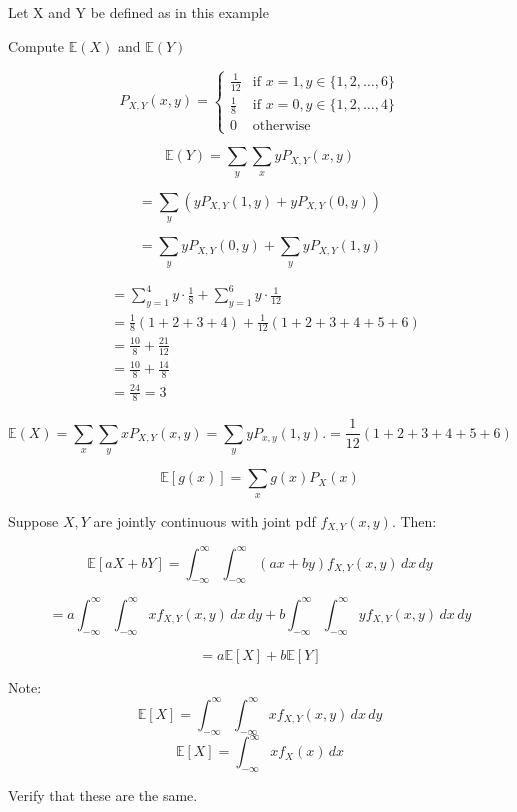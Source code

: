 \documentclass{article}
\begin{document}
    Let X and Y be defined as in this example

    Compute $\mathbb{E}(X)$ and $\mathbb{E}(Y)$

    \[P_{X,Y}(x,y) = 
    \begin{cases}
        \frac{1}{12} & \text{if } x = 1, y \in \{1,2,\ldots,6\} \\
        \frac{1}{8} & \text{if } x = 0, y \in \{1,2,\ldots,4\} \\
        0 & \text{otherwise}
    \end{cases}\]

    \[\mathbb{E}(Y) = \sum_{y} \sum_{x} y P_{X,Y}(x,y)\]
    
    \[= \sum_{y} \left(yP_{X,Y}(1,y) + yP_{X,Y}(0,y)\right)\]
    
    \[= \sum_{y} y P_{X,Y}(0,y) + \sum_{y} y P_{X,Y}(1,y)\]
    
    \begin{align*}
        &= \sum_{y=1}^4 y \cdot \frac{1}{8} + \sum_{y=1}^6 y \cdot \frac{1}{12} \\[1ex]
        &= \frac{1}{8}(1 + 2 + 3 + 4) + \frac{1}{12}(1 + 2 + 3 + 4 + 5 + 6) \\[1ex]
        &= \frac{10}{8} + \frac{21}{12} \\[1ex]
        &= \frac{10}{8} + \frac{14}{8} \\[1ex]
        &= \frac{24}{8} = \boxed{3}
    \end{align*}

    \[
    \mathbb{E}(X) = \sum_{x} \sum_{y} x P_{X,Y}(x,y)
    = \sum_{y} y P_{x, y} (1, y).
    = \frac{1}{12}(1 + 2 + 3 + 4 + 5 + 6)
    \]
    
    \[\mathbb{E}[g(x)] = \sum_{x} g(x) P_X(x)\]

    Suppose $X, Y$ are jointly continuous with joint pdf $f_{X,Y}(x,y)$. Then:

    \[\mathbb{E}[aX + bY] = \int_{-\infty}^{\infty} \int_{-\infty}^{\infty} (ax + by) f_{X,Y}(x,y) \, dx \, dy\]

    \[= a \int_{-\infty}^{\infty} \int_{-\infty}^{\infty} x f_{X,Y}(x,y) \, dx \, dy + b \int_{-\infty}^{\infty} \int_{-\infty}^{\infty} y f_{X,Y}(x,y) \, dx \, dy\]

    \[= a\mathbb{E}[X] + b\mathbb{E}[Y]\]

    Note:
    \[\mathbb{E}[X] = \int_{-\infty}^{\infty} \int_{-\infty}^{\infty} x f_{X,Y}(x,y) \, dx \, dy 
    \]
    \[\mathbb{E}[X] =  \int_{-\infty}^{\infty} x f_X(x) \, dx\]

    Verify that these are the same.
\end{document}
